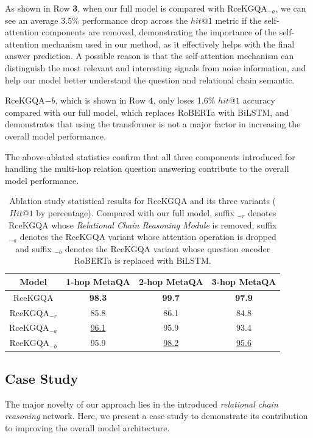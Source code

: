 \documentclass[pdflatex,sn-mathphys]{sn-jnl}%
\theoremstyle{thmstyleone}%
\theoremstyle{thmstyletwo}%
\theoremstyle{thmstylethree}%
\begin{document}
As shown in Row \textbf{3}, when our full model is compared with RceKGQA$_{-a}$, we can see an average 3.5\% performance drop across the $hit@1$ metric if the self-attention components are removed, demonstrating the importance of the self-attention mechanism used in our method, as it effectively helps with the final answer prediction. A possible reason is that the self-attention mechanism can distinguish the most relevant and interesting signals from noise information, and help our model better understand the question and relational chain semantic.

RceKGQA${-b}$, which is shown in Row \textbf{4}, only loses 1.6\% $hit@1$ accuracy compared with our full model, which replaces RoBERTa with BiLSTM, and demonstrates that using the transformer is not a major factor in increasing the overall model performance. 

The above-ablated statistics confirm that all three components introduced for handling the multi-hop relation question answering contribute to the overall model performance.

\begin{table}[h]
    \centering
    \begin{tabular}{c|ccc} \hline
        Model & 1-hop MetaQA & 2-hop MetaQA & 3-hop MetaQA \\ \hline
        RceKGQA & \bf{98.3} & \bf{99.7} & \bf{97.9} \\ \hline
        RceKGQA$_{-r}$ & 85.8 & 86.1 & 84.8 \\
        RceKGQA$_{-a}$ & \underline{96.1} & 95.9 & 93.4 \\ 
        RceKGQA$_{-b}$ & 95.9 & \underline{98.2} & \underline{95.6} \\ \hline
    \end{tabular}
    \caption{Ablation study statistical results for RceKGQA and its three variants ($Hit@1$ by percentage). Compared with our full model, suffix $_{-r}$ denotes RceKGQA whose \textit{Relational Chain Reasoning Module} is removed, suffix $_{-a}$ denotes the RceKGQA variant whose attention operation is dropped and suffix $_{-b}$ denotes the RceKGQA variant whose question encoder RoBERTa is replaced with BiLSTM.}
    \label{comparison_ablation}
\end{table}

\subsection{Case Study}
The major novelty of our approach lies in the introduced \textit{relational chain reasoning} network. Here, we present a case study to demonstrate its contribution to improving the overall model architecture.
\end{document}
